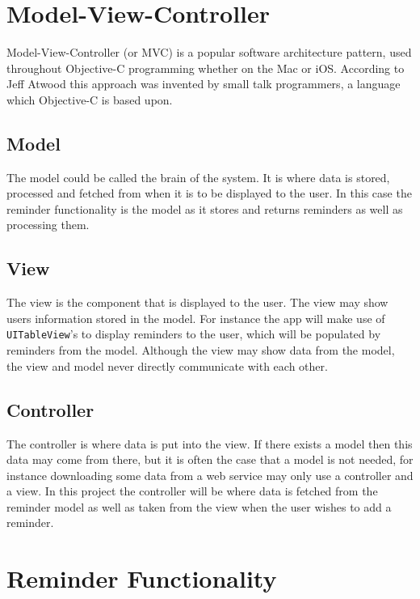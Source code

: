 \documentclass[12pt]{report}
\begin{document}
\section{Model-View-Controller}

Model-View-Controller (or MVC) is a popular software architecture pattern, used throughout Objective-C programming whether on the Mac or iOS. According to Jeff Atwood \cite{mvc} this approach was invented by small talk programmers, a language which Objective-C is based upon.

\subsection{Model}

The model could be called the brain of the system. It is where data is stored, processed and fetched from when it is to be displayed to the user. In this case the reminder functionality is the model as it stores and returns reminders as well as processing them. 

\subsection{View}

The view is the component that is displayed to the user. The view may show users information stored in the model. For instance the app will make use of \texttt{UITableView}'s to display reminders to the user, which will be populated by reminders from the model. Although the view may show data from the model, the view and model never directly communicate with each other.

\subsection{Controller}

The controller is where data is put into the view. If there exists a model then this data may come from there, but it is often the case that a model is not needed, for instance downloading some data from a web service may only use a controller and a view. In this project the controller will be where data is fetched from the reminder model as well as taken from the view when the user wishes to add a reminder.

\section{Reminder Functionality}
\end{document}
